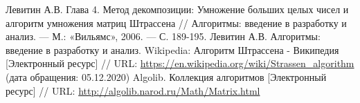 \documentclass{report}
\begin{document}
\begin{thebibliography}{1}
 Левитин А.В. Глава 4. Метод декомпозиции: Умножение больших целых чисел и алгоритм умножения матриц Штрассена // Алгоритмы: введение в разработку и анализ. — М.: «Вильямс», 2006. — С. 189-195. 
Левитин А.В. Алгоритмы: введение в разработку и анализ.
 Wikipedia: Алгоритм Штрассена - Википедия [Электронный ресурс] // URL: \url {https://en.wikipedia.org/wiki/Strassen_algorithm} (дата обращения: 05.12.2020)
 Algolib. Коллекция алгоритмов [Электронный ресурс] // URL: \url {http://algolib.narod.ru/Math/Matrix.html}

\end{thebibliography}
\newpage

\end{document}
